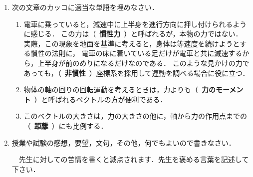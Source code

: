 \documentclass[a4paper,11pt]{ltjsarticle}
\begin{document}
\begin{enumerate}[label={\LARGE \Roman*}]
    ボールには重力の他に力がはたらいていないから，力学的エネルギー$E$は保存する．

    \begin{equation}
      \renewcommand{\arraystretch}{1.5}
        \begin{array}{rrcl}
            & E_1 &=& E_2 \\
            \Leftrightarrow & \dfrac{1}{2}m\bm{v}_0^2 &=& \dfrac{1}{2}m\bm{v}^2 + m\bm{g}H \\
            \Leftrightarrow & \bm{v}_0^2              &=& \bm{v}^2 + 2\bm{g}H \\
            \Leftrightarrow & \bm{v}^2                &=& \bm{v}_0 - 2\bm{g}H \\
                          = & 225 - 200               &=& 25\ [\mathrm{m^2/s^2}] \\
            \Leftrightarrow & \bm{v}                  &=& 5.0\ [\mathrm{m/s}]
        \end{array}
    \end{equation}

    \vspace{5pt}

    \item 次の文章のカッコに適当な単語を埋めなさい．
    
    \vspace{5pt}

    \begin{enumerate}[label=(\arabic*)]
        \item 電車に乗っていると，減速中に上半身を進行方向に押し付けられるように感じる．
        この力は（\ \textbf{\color{cyan}慣性力}\ ）と呼ばれるが，本物の力ではない．
        実際，この現象を地面を基準に考えると，身体は等速度を続けようとする慣性の法則に，
        電車の床に着いている足だけが電車と共に減速するから，上半身が前のめりになるだけなのである．
        このような見かけの力であっても，（\ \textbf{\color{cyan}非慣性}\ ）座標系を採用して運動を調べる場合に役に立つ．

        \item 物体の軸の回りの回転運動を考えるときは，力よりも（\ \textbf{\color{cyan}力のモーメント}\ ）と呼ばれるベクトルの方が便利である．
        \item このベクトルの大きさは，力の大きさの他に，軸から力の作用点までの（\ \textbf{\color{cyan}距離}\ ）にも比例する．
    \end{enumerate}

    \vspace{5pt}

    \item 授業や試験の感想，要望，文句，その他，何でもよいので書きなさい．

    \vspace{5pt}

    　先生に対しての苦情を書くと減点されます．先生を褒める言葉を記述して下さい．

\end{enumerate}
\end{document}
